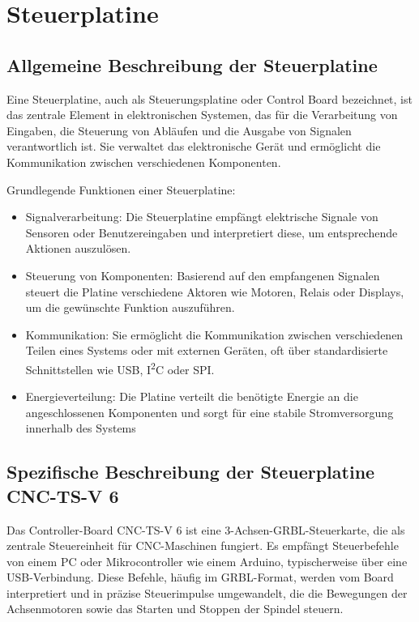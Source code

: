 %
%
%

\chapter{Steuerplatine}


\section{Allgemeine Beschreibung der Steuerplatine}

Eine Steuerplatine, auch als Steuerungsplatine oder Control Board bezeichnet, ist das zentrale Element in elektronischen Systemen, das für die Verarbeitung von Eingaben, die Steuerung von Abläufen und die Ausgabe von Signalen verantwortlich ist. Sie verwaltet das elektronische Gerät und ermöglicht die Kommunikation zwischen verschiedenen Komponenten.

Grundlegende Funktionen einer Steuerplatine:
\begin{itemize}
	\item Signalverarbeitung: Die Steuerplatine empfängt elektrische Signale von Sensoren oder Benutzereingaben und interpretiert diese, um entsprechende Aktionen auszulösen.
	
	\item Steuerung von Komponenten: Basierend auf den empfangenen Signalen steuert die Platine verschiedene Aktoren wie Motoren, Relais oder Displays, um die gewünschte Funktion auszuführen.
	
	\item Kommunikation: Sie ermöglicht die Kommunikation zwischen verschiedenen Teilen eines Systems oder mit externen Geräten, oft über standardisierte Schnittstellen wie USB, I\textsuperscript{2}C oder SPI.
	
	\item Energieverteilung: Die Platine verteilt die benötigte Energie an die angeschlossenen Komponenten und sorgt für eine stabile Stromversorgung innerhalb des Systems
\end{itemize}

\section{Spezifische Beschreibung der Steuerplatine CNC-TS-V 6}

Das Controller-Board CNC-TS-V 6 ist eine 3-Achsen-GRBL-Steuerkarte, die als zentrale Steuereinheit für CNC-Maschinen fungiert. Es empfängt Steuerbefehle von einem PC oder Mikrocontroller wie einem Arduino, typischerweise über eine USB-Verbindung. Diese Befehle, häufig im GRBL-Format, werden vom Board interpretiert und in präzise Steuerimpulse umgewandelt, die die Bewegungen der Achsenmotoren sowie das Starten und Stoppen der Spindel steuern.

